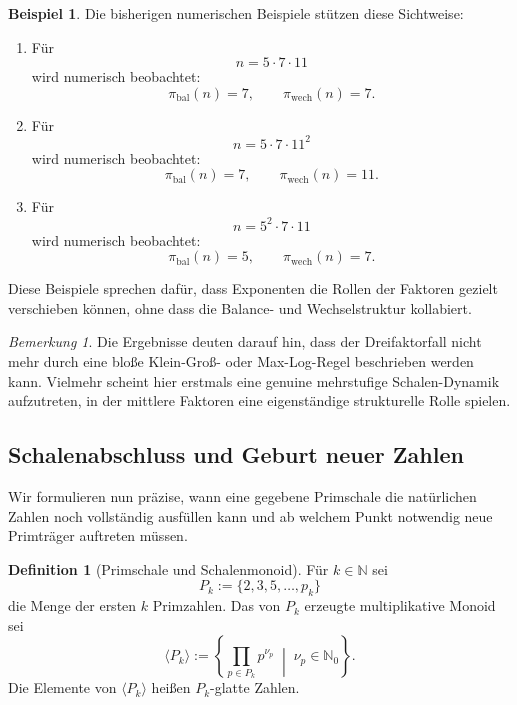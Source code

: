 \documentclass[11pt,a4paper]{article}
\theoremstyle{definition}
\newtheorem{definition}[satz]{Definition}
\newtheorem{beispiel}[satz]{Beispiel}
\theoremstyle{remark}
\newtheorem{bemerkung}[satz]{Bemerkung}
\begin{document}
	\begin{beispiel}
		Die bisherigen numerischen Beispiele stützen diese Sichtweise:
		
		\begin{enumerate}
			\item Für
			\[
			n=5\cdot 7\cdot 11
			\]
			wird numerisch beobachtet:
			\[
			\pi_{\mathrm{bal}}(n)=7,\qquad \pi_{\mathrm{wech}}(n)=7.
			\]
			
			\item Für
			\[
			n=5\cdot 7\cdot 11^2
			\]
			wird numerisch beobachtet:
			\[
			\pi_{\mathrm{bal}}(n)=7,\qquad \pi_{\mathrm{wech}}(n)=11.
			\]
			
			\item Für
			\[
			n=5^2\cdot 7\cdot 11
			\]
			wird numerisch beobachtet:
			\[
			\pi_{\mathrm{bal}}(n)=5,\qquad \pi_{\mathrm{wech}}(n)=7.
			\]
		\end{enumerate}
		
		Diese Beispiele sprechen dafür, dass Exponenten die Rollen der Faktoren gezielt
		verschieben können, ohne dass die Balance- und Wechselstruktur kollabiert.
	\end{beispiel}
	
	\begin{bemerkung}
		Die Ergebnisse deuten darauf hin, dass der Dreifaktorfall nicht mehr durch eine bloße
		Klein-Groß- oder Max-Log-Regel beschrieben werden kann. Vielmehr scheint hier erstmals
		eine genuine mehrstufige Schalen-Dynamik aufzutreten, in der mittlere Faktoren eine
		eigenständige strukturelle Rolle spielen.
	\end{bemerkung}
	
	\subsection{Schalenabschluss und Geburt neuer Zahlen}
	
	Wir formulieren nun präzise, wann eine gegebene Primschale die natürlichen Zahlen
	noch vollständig ausfüllen kann und ab welchem Punkt notwendig neue Primträger
	auftreten müssen.
	
	\begin{definition}[Primschale und Schalenmonoid]
		Für \(k\in\mathbb N\) sei
		\[
		P_k:=\{2,3,5,\dots,p_k\}
		\]
		die Menge der ersten \(k\) Primzahlen. Das von \(P_k\) erzeugte multiplikative Monoid sei
		\[
		\langle P_k\rangle
		:=
		\left\{
		\prod_{p\in P_k} p^{\nu_p}
		\;\middle|\;
		\nu_p\in\mathbb N_0
		\right\}.
		\]
		Die Elemente von \(\langle P_k\rangle\) heißen \(P_k\)-glatte Zahlen.
	\end{definition}
	
\end{document}
